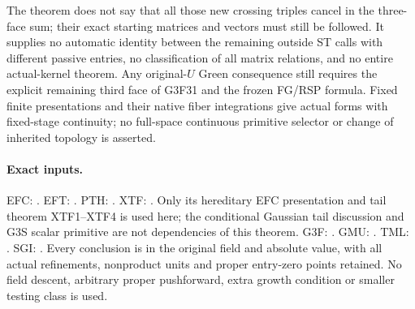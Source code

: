 The theorem does not say that all those new crossing triples
cancel in the three-face sum; their exact starting matrices and
vectors must still be followed.  It supplies no automatic identity
between the remaining outside ST calls with different passive
entries, no classification of all matrix relations, and no entire
actual-kernel theorem.  Any original-$U$ Green consequence still
requires the explicit remaining third face of G3F31 and the
frozen FG/RSP formula.  Fixed finite presentations and their
native fiber integrations give actual forms with fixed-stage
continuity; no full-space continuous primitive selector or
change of inherited topology is asserted.

\paragraph{Exact inputs.}
EFC: .
EFT: .
PTH: .
XTF: .
Only its hereditary EFC presentation and tail theorem XTF1--XTF4
is used here; the conditional Gaussian tail discussion and G3S
scalar primitive are not dependencies of this theorem.
G3F: .
GMU: .
TML: .
SGI: .
Every conclusion is in the original field and absolute value, with
all actual refinements, nonproduct units and proper entry-zero
points retained.  No field descent, arbitrary proper pushforward,
extra growth condition or smaller testing class is used.
